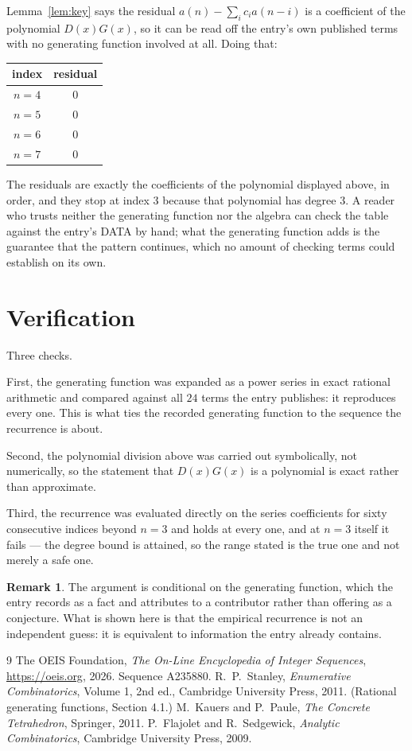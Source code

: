 \documentclass[11pt,a4paper]{article}
\theoremstyle{plain}
\theoremstyle{definition}
\newtheorem{remark}[theorem]{Remark}
\begin{document}
Lemma~\ref{lem:key} says the residual $a(n)-\sum_ic_ia(n-i)$ is a coefficient of the
polynomial $D(x)G(x)$, so it can be read off the entry's own published terms with no
generating function involved at all. Doing that:
\begin{center}
\begin{tabular}{cc}
index & residual \\ \hline
$n=4$ & $0$ \\
$n=5$ & $0$ \\
$n=6$ & $0$ \\
$n=7$ & $0$
\end{tabular}
\end{center}
The residuals are exactly the coefficients of the polynomial displayed above, in order, and
they stop at index $3$ because that polynomial has degree $3$. A reader who trusts
neither the generating function nor the algebra can check the table against the entry's DATA
by hand; what the generating function adds is the guarantee that the pattern continues, which
no amount of checking terms could establish on its own.

\section{Verification}

Three checks.

First, the generating function was expanded as a power series in exact rational arithmetic and
compared against all $24$ terms the entry publishes: it reproduces every one. This is
what ties the recorded generating function to the sequence the recurrence is about.

Second, the polynomial division above was carried out symbolically, not numerically, so the
statement that $D(x)G(x)$ is a polynomial is exact rather than approximate.

Third, the recurrence was evaluated directly on the series coefficients for sixty consecutive
indices beyond $n=3$ and holds at every one, and at $n=3$ itself it fails --- the
degree bound is attained, so the range stated is the true one and not merely a safe one.

\begin{remark}
The argument is conditional on the generating function, which the entry records as a fact and
attributes to a contributor rather than offering as a conjecture. What is shown here is that
the empirical recurrence is not an independent guess: it is equivalent to information the
entry already contains.
\end{remark}

\begin{thebibliography}{9}
 The OEIS Foundation, \emph{The On-Line Encyclopedia of Integer
Sequences}, \url{https://oeis.org}, 2026. Sequence A235880.
 R.~P.~Stanley, \emph{Enumerative Combinatorics}, Volume 1, 2nd ed.,
Cambridge University Press, 2011. (Rational generating functions, Section 4.1.)
 M.~Kauers and P.~Paule, \emph{The Concrete Tetrahedron}, Springer, 2011.
 P.~Flajolet and R.~Sedgewick, \emph{Analytic Combinatorics}, Cambridge
University Press, 2009.
\end{thebibliography}
\end{document}
